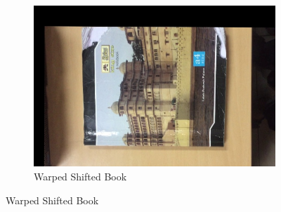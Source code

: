 \documentclass[paper=a4, fontsize=11pt]{scrartcl} %
\begin{document}
\begin{figure}
\begin{subfigure}[ht]{0.475\textwidth}
        \centering 
        \includegraphics[width=\textwidth]{figures/book_corr_warp.jpg}
        \caption{Warped Shifted Book\label{fig:book_corr_warp}}
    \end{subfigure}


\end{figure}
\end{document}
